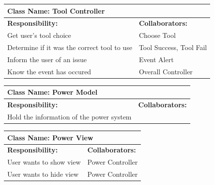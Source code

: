 \documentclass[12pt, titlepage]{article}
\begin{document}
\begin{enumerate}[a)]
	\begin{table}[H]
		\centering
		\begin{tabular}{|p{5cm}|p{5cm}|}
		\hline 
		 \multicolumn{2}{|l|}{\textbf{Class Name: Tool Controller}} \\
		\hline
		\textbf{Responsibility:} & \textbf{Collaborators:} \\
		\hline
		 Get user's tool choice & Choose Tool\\
		\hline
		 Determine if it was the correct tool to use & Tool Success, Tool Fail \\
		\hline
		 Inform the user of an issue & Event Alert \\
		\hline
		 Know the event has occured & Overall Controller \\
		\hline
		\end{tabular}
	\end{table}

	\begin{table}[H]
		\centering
		\begin{tabular}{|p{5cm}|p{5cm}|}
		\hline 
		 \multicolumn{2}{|l|}{\textbf{Class Name: Power Model}} \\
		\hline
		\textbf{Responsibility:} & \textbf{Collaborators:} \\
		\hline
		 Hold the information of the power system & \\
		\hline
		\end{tabular}
	\end{table}

	\begin{table}[H]
		\centering
		\begin{tabular}{|p{5cm}|p{5cm}|}
		\hline 
		 \multicolumn{2}{|l|}{\textbf{Class Name: Power View}} \\
		\hline
		\textbf{Responsibility:} & \textbf{Collaborators:} \\
		\hline
		 User wants to show view & Power Controller\\
		\hline
		User wants to hide view & Power Controller\\
		\hline
		\end{tabular}
	\end{table}


\end{enumerate}
\end{document}

